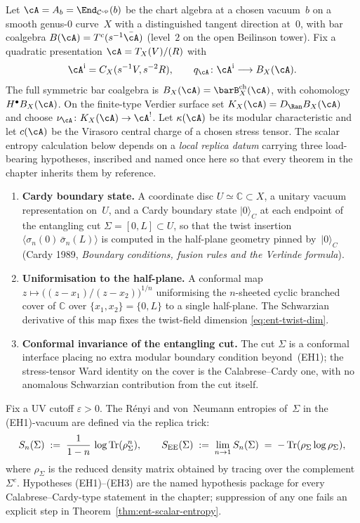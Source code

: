 \begin{setup}
\label{setup:ent-framework}
Let $\cA=A_b=\End_{\mathcal C^{\mathrm{op}}}(b)$ be the chart algebra
at a chosen vacuum~$b$ on a smooth genus-$0$ curve~$X$ with a
distinguished tangent direction at~$0$, with bar coalgebra
$B(\cA)=T^c(s^{-1}\bar\cA)$ (level~$2$ on the open Beilinson
tower).  Fix a quadratic presentation
$\cA=T_X(V)/(R)$ with
\[
\cA^{\mathrm i}=C_X(s^{-1}V,s^{-2}R),\qquad
q_\cA\colon\cA^{\mathrm i}\longrightarrow B_X(\cA).
\]
The full symmetric bar coalgebra is
$B_X(\cA)=\barB_X^{\mathrm{ch}}(\cA)$, with cohomology
$H^\bullet B_X(\cA)$.  On the finite-type Verdier surface set
$K_X(\cA)=D_{\Ran}B_X(\cA)$ and choose
$\nu_\cA\colon K_X(\cA)\to\cA^!$.  Let $\kappa(\cA)$ be its modular
characteristic and let $c(\cA)$ be the Virasoro central charge of a
chosen stress tensor.  The scalar entropy calculation below depends on
a \emph{local replica datum} carrying three load-bearing hypotheses,
inscribed and named once here so that every theorem in the chapter
inherits them by reference.
\begin{enumerate}[label=\textup{(EH\arabic*)}]
\item \textbf{Cardy boundary state.}
A coordinate disc $U\simeq\mathbb C\subset X$, a unitary vacuum
representation on~$U$, and a Cardy boundary state $|0\rangle_C$ at
each endpoint of the entangling cut $\Sigma=[0,L]\subset U$, so that
the twist insertion $\langle\sigma_n(0)\,\bar\sigma_n(L)\rangle$ is
computed in the half-plane geometry pinned by~$|0\rangle_C$
\textup{(}Cardy 1989, \emph{Boundary conditions, fusion rules and the
Verlinde formula}\textup{)}.
\item \textbf{Uniformisation to the half-plane.}
A conformal map
$z\mapsto\bigl((z-x_1)/(z-x_2)\bigr)^{1/n}$ uniformising the
$n$-sheeted cyclic branched cover of $\mathbb C$ over
$\{x_1,x_2\}=\{0,L\}$ to a single half-plane.  The Schwarzian
derivative of this map fixes the twist-field dimension
\eqref{eq:ent-twist-dim}.
\item \textbf{Conformal invariance of the entangling cut.}
The cut $\Sigma$ is a conformal interface placing no extra modular
boundary condition beyond~(EH1); the stress-tensor Ward identity on
the cover is the Calabrese--Cardy one, with no anomalous Schwarzian
contribution from the cut itself.
\end{enumerate}
Fix a UV cutoff $\varepsilon>0$.  The R\'enyi and von~Neumann entropies
of~$\Sigma$ in the (EH1)-vacuum are defined via the replica trick:
\begin{equation}\label{eq:ent-renyi-def}
S_n(\Sigma)
\;:=\;
\frac{1}{1-n}\,\log \operatorname{Tr}(\rho_\Sigma^n),
\qquad
S_{\mathrm{EE}}(\Sigma)
\;:=\;
\lim_{n \to 1} S_n(\Sigma)
\;=\;
-\operatorname{Tr}(\rho_\Sigma \log \rho_\Sigma),
\end{equation}
where $\rho_\Sigma$ is the reduced density matrix obtained by
tracing over the complement $\Sigma^c$.  Hypotheses (EH1)--(EH3)
are the named hypothesis package for every Calabrese--Cardy-type
statement in the chapter; suppression of any one fails an explicit
step in Theorem~\ref{thm:ent-scalar-entropy}.
\end{setup}

